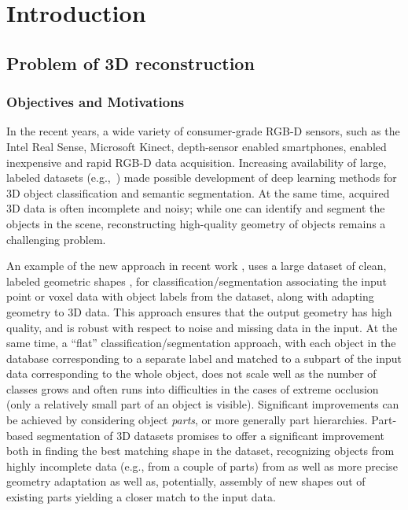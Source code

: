 
\chapter{Introduction}




\section{Problem of 3D reconstruction}
\subsection{Objectives and Motivations}

In the recent years, a wide variety of consumer-grade RGB-D sensors, such as the Intel Real Sense, Microsoft Kinect, depth-sensor enabled smartphones, enabled inexpensive and rapid RGB-D data acquisition. Increasing availability of large, labeled datasets (e.g.,~\cite{chang2017matterport3d,dai2017scannet})  made possible development of deep learning methods for 3D object classification and semantic segmentation. At the same time, acquired 3D data is often incomplete and noisy; while one can identify and segment the objects in the scene, reconstructing high-quality geometry of objects remains a challenging problem.  

An example of the new approach in recent work 
\cite{avetisyan2019scan2cad}, uses a large dataset of clean, labeled geometric shapes
\cite{chang2015shapenet}, for classification/segmentation associating the input point or voxel data with object labels from the dataset, along with adapting geometry to 3D data.  This approach ensures that the output geometry has high quality, and is robust with respect to noise and missing data in the input.  
At the same time, a ``flat'' classification/segmentation approach, with each object in the database corresponding to a separate label and matched to a subpart of the input data corresponding to the whole object, does not scale well as the number of classes grows and often runs into difficulties in the cases of extreme occlusion (only a relatively small part of an object is visible). 
Significant improvements can be achieved by considering object \emph{parts}, or more generally part hierarchies. 
Part-based segmentation of 3D datasets promises to offer a significant improvement both in finding the best matching shape in the dataset, recognizing objects from  highly incomplete data (e.g., from a couple of parts) from  as well as more precise geometry adaptation as well as, potentially, assembly of new shapes out of existing parts yielding a closer match to the input data. 

